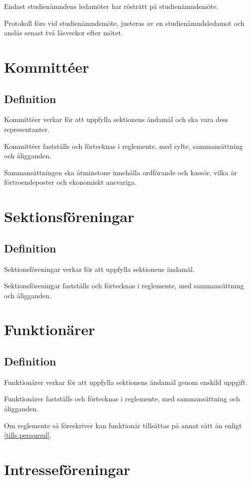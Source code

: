 \documentclass{styrdokument}
\begin{document}
\? Endast studienämndens ledamöter har rösträtt på studienämndsmöte.

\? Protokoll förs vid studienämndsmöte, justeras av en studienämndsledamot och anslås senast två läsveckor efter mötet.

\section{Kommittéer}
\subsection{Definition}

\? Kommittéer verkar för att uppfylla sektionens ändamål och ska vara dess representanter.

\? Kommittéer fastställs och förtecknas i reglemente, med syfte, sammansättning och åligganden.

\? Sammansättningen ska åtminstone innehålla ordförande och kassör, vilka är förtroendeposter och ekonomiskt ansvariga.

\section{Sektionsföreningar}
\subsection{Definition}

\? Sektionsföreningar verkar för att uppfylla sektionens ändamål.

\? Sektionsföreningar fastställs och förtecknas i reglemente, med sammansättning och åligganden.

\section{Funktionärer}
\subsection{Definition}

\? Funktionärer verkar för att uppfylla sektionens ändamål genom enskild uppgift.

\? Funktionärer fastställs och förtecknas i reglemente, med sammansättning och åligganden.

\? Om reglemente så föreskriver kan funktionär tillsättas på annat sätt än enligt \cref{tills.personval}.

\section{Intresseföreningar}
\end{document}
